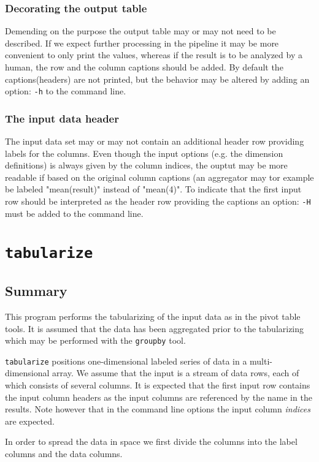 \documentclass{report}
\begin{document}
\subsubsection{Decorating the output table}
Demending on the purpose the output table may or may not need to be described. If
we expect further processing in the pipeline it may be more convenient to only
print the values, whereas if the result is to be analyzed by a human, the row and
the column captions should be added. By default the captions(headers) are not
printed, but the behavior may be altered by adding an option: \texttt{-h} to the
command line.

\subsubsection{The input data header}
The input data set may or may not contain an additional header row providing
labels for the columns. Even though the input options (e.g. the dimension
definitions) is always given by the column indices, the ouptut may be more
readable if based on the original column captions (an aggregator may tor example
be labeled "mean(result)" instead of "mean(4)". To indicate that the first input
row should be interpreted as the header row providing the captions an option:
\texttt{-H} must be added to the command line.


\section{\texttt{tabularize}}

\subsection{Summary}
This program performs the tabularizing of the input data as in the pivot table
tools. It is assumed that the data has been aggregated prior to the tabularizing
which may be performed with the \texttt{groupby} tool.

\texttt{tabularize} positions one-dimensional labeled series of data in a
multi-dimensional array. We assume that the input is a stream of data rows,
each of which consists of several columns. It is expected that the first input 
row contains the input column headers as the input columns are referenced by the
name in the results. Note however that in the command line options the input
column \textit{indices} are expected.

In order to spread the data in space we first divide the columns into the
label columns and the data columns.
\end{document}
